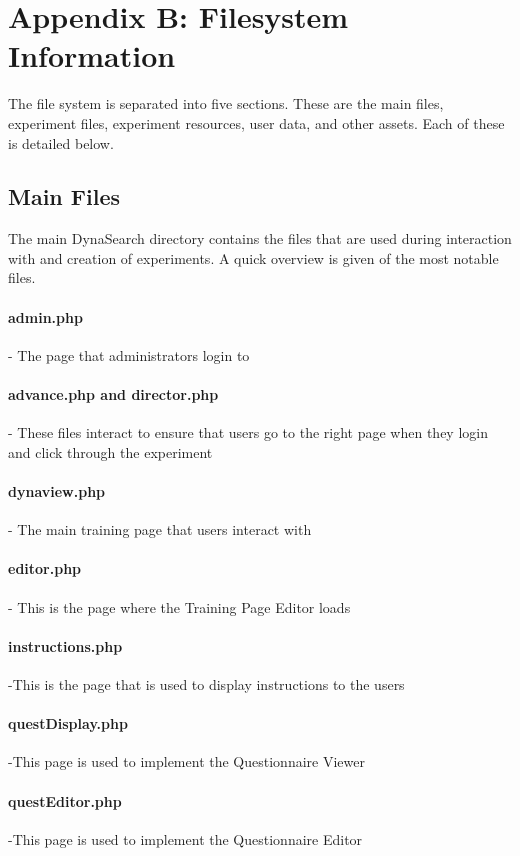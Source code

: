 \documentclass[article]{ij4uq}              %
\begin{document}
\section{Appendix B: Filesystem Information}
The file system is separated into five sections. These are the main files, experiment files, experiment resources, user data, and other assets. Each of these is detailed below.

\subsection{Main Files}
The main DynaSearch directory contains the files that are used during interaction with and creation of experiments. A quick overview is given of the most notable files.

\paragraph{admin.php} - The page that administrators login to

\paragraph{advance.php and director.php} - These files interact to ensure that users go to the right page when they login and click through the experiment

\paragraph{dynaview.php} - The main training page that users interact with

\paragraph{editor.php} - This is the page where the Training Page Editor loads

\paragraph{instructions.php} -This is the page that is used to display instructions to the users 

\paragraph{questDisplay.php} -This page is used to implement the Questionnaire Viewer

\paragraph{questEditor.php} -This page is used to implement the Questionnaire Editor 
\end{document}
